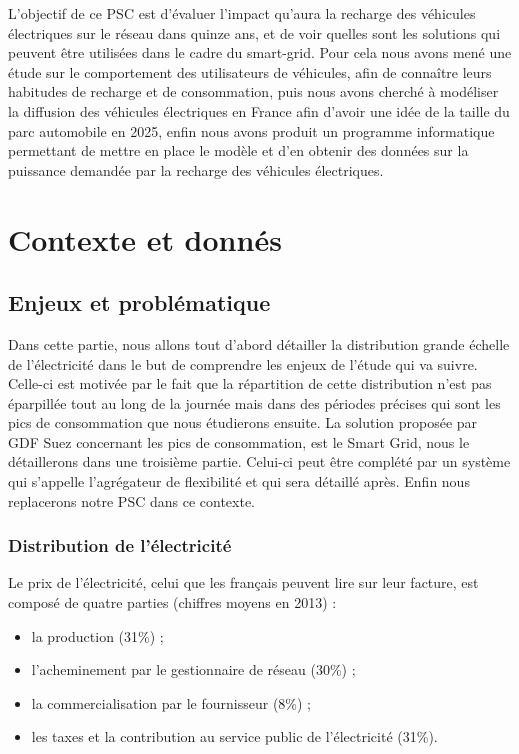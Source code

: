 \documentclass[10pt]{article}
\begin{document}
L'objectif de ce PSC est d'évaluer l'impact qu'aura la recharge des véhicules électriques sur le réseau dans quinze ans, et de voir quelles sont les solutions qui peuvent être utilisées dans le cadre du smart-grid. Pour cela nous avons mené une étude sur le comportement des utilisateurs de véhicules, afin de connaître leurs habitudes de recharge et de consommation, puis nous avons cherché à modéliser la diffusion des véhicules électriques en France afin d'avoir une idée de la taille du parc automobile en 2025, enfin nous avons produit un programme informatique permettant de mettre en place le modèle et d'en obtenir des données sur la puissance demandée par la recharge des véhicules électriques.

\section{Contexte et donn\'es}

	\subsection{Enjeux et probl\'ematique}
	
		Dans cette partie, nous allons tout d’abord détailler la distribution grande échelle de l’électricité dans le but de comprendre les enjeux de l’étude qui va suivre. Celle-ci est motivée par le fait que la répartition de cette distribution n’est pas éparpillée tout au long de la journée mais dans des périodes précises qui sont les pics de consommation que nous étudierons ensuite. La solution proposée par GDF Suez concernant les pics de consommation, est le Smart Grid, nous le détaillerons dans une troisième partie. Celui-ci peut être complété par un système qui s’appelle l’agrégateur de flexibilité et qui sera détaillé après. Enfin nous replacerons notre PSC dans ce contexte.
		
		\subsubsection{Distribution de l'électricité}
		
			Le prix de l'électricité, celui que les français peuvent lire sur leur facture, est composé de quatre parties (chiffres moyens en 2013) :
			\begin{itemize}
				\item la production (31\%) ;
				\item l'acheminement par le gestionnaire de réseau (30\%) ;
				\item la commercialisation par le fournisseur (8\%) ;
				\item les taxes et la contribution au service public de l'électricité (31\%).
			\end{itemize}
			
\end{document}
